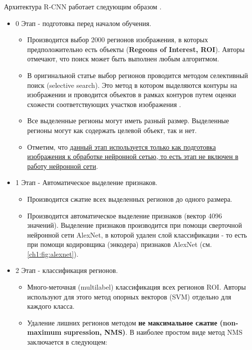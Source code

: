 \documentclass[12pt]{article}
\begin{document}
\begin{sloppypar}
Архитектура R-CNN работает следующим образом \cite{girshick2014rich}.
\begin{itemize} \itemsep 0.0em
    \item 0 Этап - подготовка перед началом обучения.
    \begin{itemize}\itemsep 0.0em
        \item Производится выбор 2000 регионов изображения, в которых предположительно есть объекты (\textbf{Regeons of Interest, ROI}). Авторы отмечают, что поиск может быть выполнен любым алгоритмом. 
        \item  В оригинальной статье выбор регионов проводится методом селективный поиск (selective search). Это метод  в котором выделяются контуры на изображении и проводится объектов в рамках контуров путем оценки схожести соответствующих участков изображения \cite{uijlings2013selective}.
        \item \qquad Все выделенные регионы могут иметь разный размер. Выделенные регионы могут как содержать целевой объект, так и нет.
        \item Отметим, что 
        \uline{данный этап используется только как подготовка изображения к обработке нейронной сетью, то есть этап не включен в работу нейронной сети}.
    \end{itemize}
    \item  1 Этап - Автоматическое выделение признаков.
    \begin{itemize}\itemsep 0.0em
        \item Производится сжатие всех выделенных регионов до одного размера. 
        \item Производится автоматическое выделение признаков (вектор 4096 значений). Выделение признаков производится при помощи сверточной нейронной сети AlexNet, в которой удален слой классификации - то есть при помощи кодировщика (энкодера) признаков AlexNet (см. \ref{ch1:fig:alexnet}).
    \end{itemize}
    \item  2 Этап - классификация регионов.
    \begin{itemize}\itemsep 0.0em
        \item Много-меточная (multilabel) классификация всех регионов ROI. Авторы используют для этого метод опорных векторов (SVM) отдельно для каждого класса.
        \item Удаление лишних регионов методом \textbf{не максимальное сжатие (non-maximum supression, NMS)}.
        В наиболее простом виде метод NMS заключается в следующем: 
        \begin{itemize}

\end{itemize}
\end{itemize}
\end{itemize}
\end{sloppypar}
\end{document}
